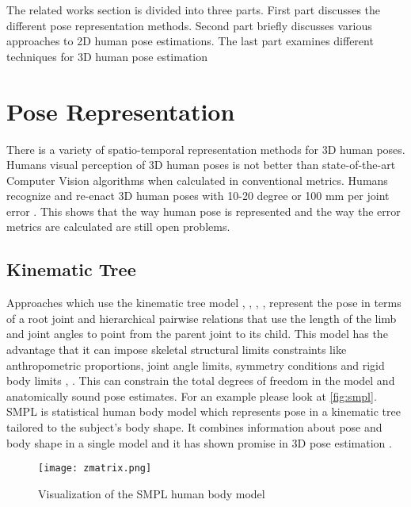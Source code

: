 The related works section is divided into three parts. First part discusses the different pose representation methods. Second part briefly discusses various approaches to 2D human pose estimations. The last part examines different techniques for 3D human pose estimation 

\section{Pose Representation}

There is a variety of spatio-temporal representation methods for 3D human poses. Humans visual perception of 3D human poses is not better than state-of-the-art Computer Vision algorithms when calculated in conventional metrics. Humans recognize and re-enact 3D human poses with 10-20 degree or 100 mm per joint error \parencite{marinoiu2013pictorial}. This shows that the way human pose is represented and the way the error metrics are calculated are still open problems.

\subsection{Kinematic Tree}

Approaches which use the kinematic tree model \parencite{barron2001estimating}, \parencite{wei2009modeling}, \parencite{zhou2016deep}, \parencite{sun2017compositional}, \parencite{mehta2017monocular} represent the pose in terms of a root joint and hierarchical pairwise relations that use the length of the limb and joint angles to point from the parent joint to its child. This model has the advantage that it can impose  skeletal structural limits constraints like anthropometric proportions, joint angle limits, symmetry conditions and rigid body limits \parencite{dabral2017structure}, \parencite{wei2009modeling}. This can constrain the total degrees of freedom in the model and anatomically sound pose estimates. For an example please look at \autoref{fig:smpl}. SMPL \parencite{loper2015smpl} is statistical human body model which represents pose in a kinematic tree tailored to the subject’s body shape. It combines information about pose and body shape in a single model and it has shown promise in 3D pose estimation \parencite{bogo2016keep}.

\begin{figure}[htpb]
    \texttt{[image: zmatrix.png]}
    \caption{Visualization of the SMPL human body model}
    \label{fig:smpl}
\end{figure}

